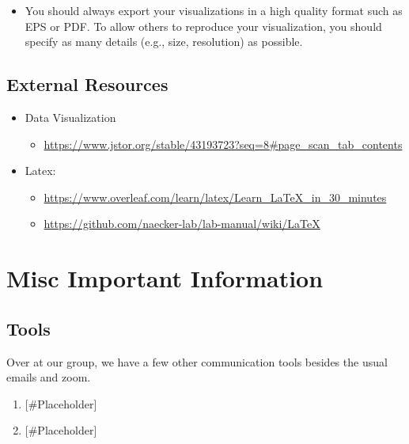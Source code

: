 \documentclass[
]{book}
\providecommand{\tightlist}{%
  \setlength{\itemsep}{0pt}\setlength{\parskip}{0pt}}
\begin{document}
\begin{itemize}
\tightlist
\item
  You should always export your visualizations in a high quality format such as EPS or PDF. To allow others to reproduce your visualization, you should specify as many details (e.g., size, resolution) as possible.
\end{itemize}

\hypertarget{external-resources-7}{%
\section{External Resources}\label{external-resources-7}}

\begin{itemize}
\item
  Data Visualization

  \begin{itemize}
  \tightlist
  \item
    \url{https://www.jstor.org/stable/43193723?seq=8\#page_scan_tab_contents}
  \end{itemize}
\item
  Latex:

  \begin{itemize}
  \item
    \url{https://www.overleaf.com/learn/latex/Learn_LaTeX_in_30_minutes}
  \item
    \url{https://github.com/naecker-lab/lab-manual/wiki/LaTeX}
  \end{itemize}
\end{itemize}

\hypertarget{misc-important-information}{%
\chapter{\texorpdfstring{\textbf{Misc Important Information}}{Misc Important Information}}\label{misc-important-information}}

\hypertarget{tools}{%
\section{\texorpdfstring{\textbf{Tools}}{Tools}}\label{tools}}

Over at our group, we have a few other communication tools besides the usual emails and zoom.

\begin{enumerate}
\def\labelenumi{\arabic{enumi}.}
\item
  {[}\#Placeholder{]}
\item
  {[}\#Placeholder{]}
\end{enumerate}
\end{document}
